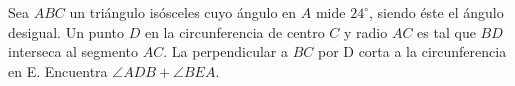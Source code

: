 Sea $ABC$ un triángulo isósceles cuyo ángulo en $A$ mide $24^\circ$, siendo éste el ángulo desigual. Un punto $D$ en la circunferencia de centro $C$ y radio $AC$ es tal que $BD$ interseca al segmento $AC$. La perpendicular a $BC$ por D corta a la circunferencia en E. Encuentra $\angle ADB + \angle BEA.$